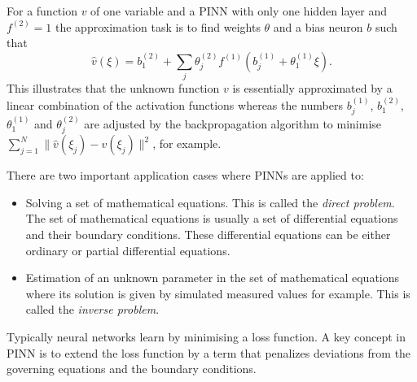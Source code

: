 \documentclass[a4paper,11pt]{article}
\begin{document}
For a function $v$ of one variable and a PINN with only one hidden layer and $f^{(2)} = 1 $ the approximation task is to find weights $\theta $ and a bias neuron $b$ such that
\begin{equation*}
\hat{v} (\xi) =   b_1^{(2)} + \sum_j \theta^{(2)}_j f^{(1)}\left( b_j^{(1)} + \theta_1^{(1)} \xi \right).
\end{equation*}
This illustrates that the unknown function $v$ is essentially approximated by a linear combination of the activation functions whereas the numbers $b_j^{(1)}$, $ b_1^{(2)} $, $ \theta_1^{(1)} $ and $ \theta^{(2)}_j $ are adjusted by the backpropagation algorithm to minimise $ \sum_{j=1}^N\| \hat{v} (\xi_j) - v(\xi_j) \|^2 $, for example.

There are two important application cases where PINNs are applied to:
\begin{itemize}
\item Solving a set of mathematical equations. This is called the \emph{direct problem}. The set of mathematical equations is usually a set of differential equations and their boundary conditions. These differential equations can be either ordinary or partial differential equations.
\item Estimation of an unknown parameter in the set of mathematical equations where its solution is given by simulated measured values for example. This is called the \emph{inverse problem}.
\end{itemize}

Typically neural networks learn by minimising a loss function. A key concept in PINN is to extend the loss function by a term that penalizes deviations from the governing equations and the boundary conditions.
\end{document}

